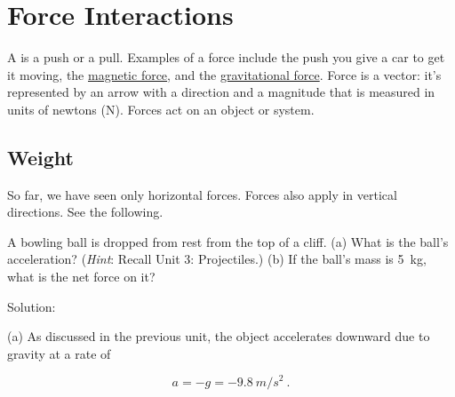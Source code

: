 \documentclass[]{article}
\begin{document}
\tableofcontents

\section{Force Interactions}

A  is a push or a pull. Examples of a force include the push you give a car to get it moving, the \href{https://youtu.be/gzCXowhks80?t=3}{magnetic force}, and the \href{https://youtu.be/E9oKEJ1pXPw}{gravitational force}. Force is a vector: it's represented by an arrow with a direction and a magnitude that is measured in units of newtons (N). Forces act on an object or system. 

\subsection{Weight} \label{CWxEgd}

So far, we have seen only horizontal forces. Forces also apply in vertical directions. See the following.

\begin{example} \label{ex:weightIntro} 
A bowling ball is dropped from rest from the top of a cliff. (a) What is the ball's acceleration? (\textit{Hint}: Recall Unit 3: Projectiles.) (b) If the ball's mass is \SI{5}{kg}, what is the net force on it?
\end{example}

Solution:

\begin{center}
\end{center}

(a) As discussed in the previous unit, the object accelerates downward due to gravity at a rate of 

\begin{equation*}
    a = -g = -\SI{9.8}{m/s^2}\ .
\end{equation*}
\end{document}
